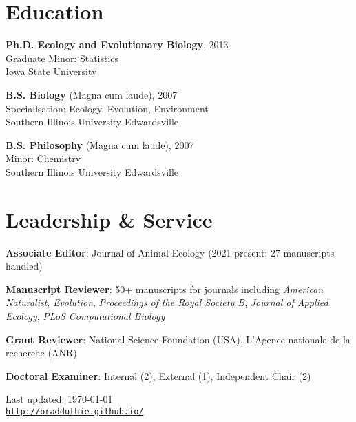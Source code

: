\documentclass[letterpaper]{article}
\def\footerlink{http://bradduthie.github.io/}
\renewenvironment{itemize}{
  \begin{list}{}{
    \setlength{\leftmargin}{1.5em}
  }
}{
  \end{list}
}
\begin{document}
\section*{Education}
\begin{itemize}
  \item {\bf Ph.D. Ecology and Evolutionary Biology}, 2013 \\
	Graduate Minor: Statistics \\
	Iowa State University
  \item {\bf B.S. Biology} (Magna cum laude), 2007 \\
	Specialisation: Ecology, Evolution, Environment \\
	Southern Illinois University Edwardsville
  \item {\bf B.S. Philosophy} (Magna cum laude), 2007 \\
	Minor: Chemistry \\
	Southern Illinois University Edwardsville
\end{itemize}

\section*{Leadership \& Service}
\begin{itemize}
\item {\bf Associate Editor}: Journal of Animal Ecology (2021-present; 27 manuscripts handled)
\item {\bf Manuscript Reviewer}: 50+ manuscripts for journals including {\it American Naturalist}, {\it Evolution}, {\it Proceedings of the Royal Society B}, {\it Journal of Applied Ecology}, {\it PLoS Computational Biology}
\item {\bf Grant Reviewer}: National Science Foundation (USA), L'Agence nationale de la recherche (ANR)
\item {\bf Doctoral Examiner}: Internal (2), External (1), Independent Chair (2)
\end{itemize}

\begin{center}
  \begin{footnotesize}
    Last updated: \today \\
    \href{\footerlink}{\texttt{\footerlink}}
  \end{footnotesize}
\end{center}
\end{document}
